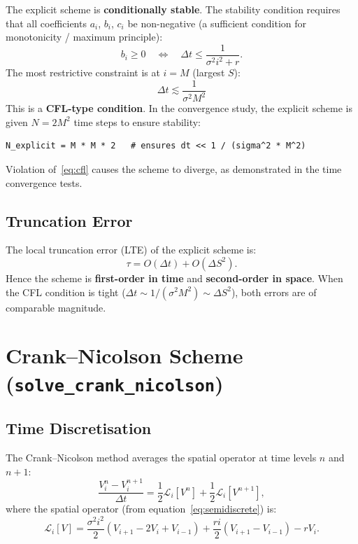 \documentclass[12pt, a4paper]{article}
\begin{document}
The explicit scheme is \textbf{conditionally stable}. The stability condition
requires that all coefficients $a_i$, $b_i$, $c_i$ be non-negative (a
sufficient condition for monotonicity / maximum principle):
\[
    b_i \geq 0 \quad \Longleftrightarrow \quad
    \Delta t \leq \frac{1}{\sigma^2 i^2 + r}.
\]
The most restrictive constraint is at $i = M$ (largest $S$):
\begin{equation}
    \boxed{\Delta t \lesssim \frac{1}{\sigma^2 M^2}}
    \label{eq:cfl}
\end{equation}
This is a \textbf{CFL-type condition}. In the convergence study, the explicit
scheme is given $N = 2M^2$ time steps to ensure stability:
\begin{lstlisting}
N_explicit = M * M * 2   # ensures dt << 1 / (sigma^2 * M^2)
\end{lstlisting}
Violation of~\eqref{eq:cfl} causes the scheme to diverge, as demonstrated in
the time convergence tests.

\subsection{Truncation Error}

The local truncation error (LTE) of the explicit scheme is:
\[
    \tau = O(\Delta t) + O(\Delta S^2).
\]
Hence the scheme is \textbf{first-order in time} and \textbf{second-order in
space}. When the CFL condition is tight ($\Delta t \sim 1/(\sigma^2 M^2) \sim
\Delta S^2$), both errors are of comparable magnitude.

\section{Crank--Nicolson Scheme (\texttt{solve\_crank\_nicolson})}

\subsection{Time Discretisation}

The Crank--Nicolson method averages the spatial operator at time levels
$n$ and $n+1$:
\begin{equation}
    \frac{V_i^n - V_i^{n+1}}{\Delta t}
    = \frac{1}{2}\mathcal{L}_i[V^n]
    + \frac{1}{2}\mathcal{L}_i[V^{n+1}],
    \label{eq:cn_abstract}
\end{equation}
where the spatial operator (from equation~\eqref{eq:semidiscrete}) is:
\[
    \mathcal{L}_i[V]
    = \frac{\sigma^2 i^2}{2}(V_{i+1} - 2V_i + V_{i-1})
    + \frac{ri}{2}(V_{i+1} - V_{i-1}) - rV_i.
\]
\end{document}
